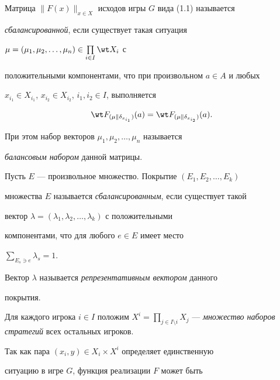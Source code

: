 \begin{defns} 


Матрица $\|F(x)\|_{x\in X}$ исходов игры $G$ вида (1.1) называется 


{\it сбалансированной}, если существует такая ситуация 


$\mu=(\mu_1,\mu_2,\dotsc,\mu_n)\in \prod\limits_{i\in I}\wt X_i$ с 


положительными компонентами, что при произвольном $a\in A$ и любых 


$x_{i_1}\in X_{i_1}$, $x_{i_2}\in X_{i_2}$, $i_1,i_2\in I$, выполняется 


$$ 


\wt F_{(\mu\|\delta_{x_{i_1}})}(a)= 


\wt F_{(\mu\|\delta_{x_{i_2}})}(a). 


$$ 


При этом набор векторов $\mu_1,\mu_2,\dotsc,\mu_n$ называется 


{\it балансовым набором} данной матрицы. 


\end{defns} 


 


\begin{defns} 


Пусть $E$ --- произвольное множество. Покрытие $(E_1,E_2,\dotsc,E_k)$ 


множества $E$ называется {\it сбалансированным}, если существует такой 


вектор $\lambda=(\lambda_1,\lambda_2,\dotsc,\lambda_k)$ с положительными 


компонентами, что для любого $e\in E$ имеет место 


$\sum\limits_{E_s\ni e}\lambda_s=1$. 


Вектор $\lambda$ называется {\it репрезентативным вектором} данного 


покрытия. 


\end{defns} 


 


Для каждого игрока $i\in I$ положим $X^i=\prod\limits_{j\in I\setminus 


i}X_j$ --- {\it множество наборов стратегий} всех остальных игроков. 


Так как пара $(x_i,y)\in X_i\times X^i$ определяет единственную 


ситуацию в игре $G$, функция реализации $F$ может быть 


